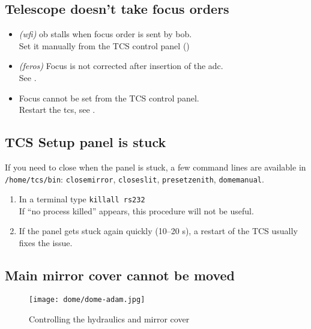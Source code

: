 \documentclass[11pt,fleqn,a4paper]{book}
\begin{document}
\subsection{Telescope doesn't take focus orders}

\begin{itemize}
  \item \textit{(\gls{wfi})} \gls{ob} \gls{stall}s when \gls{focus} order is sent by \gls{bob}.\\
        Set it manually from the \gls{TCS control panel} ()
  \item \textit{(\gls{feros})} Focus is not corrected after insertion of the \gls{adc}.\\
        See .
  \item Focus cannot be set from the \gls{TCS control panel}.\\
        Restart the \gls{tcs}, see .
\end{itemize}

\subsection{TCS Setup panel is stuck}

If you need to close when the panel is stuck, a few command lines are available in \texttt{/home/tcs/bin}: \texttt{closemirror}, \texttt{closeslit}, \texttt{presetzenith}, \texttt{domemanual}. 

\label{proc:unstuckTCSpanel}
\begin{enumerate}
  \item In a terminal type \texttt{killall rs232}\\
        If ``no process killed'' appears, this procedure will not be useful.
  \item If the panel gets stuck again quickly (10--20 s), a restart of the TCS usually fixes the issue. 
\end{enumerate}

\subsection{Main mirror cover cannot be moved}
\begin{figure}
\centering
\texttt{[image: dome/dome-adam.jpg]}
\caption{Controlling the hydraulics and mirror cover}
\label{fig:dome-adam}
\end{figure}
\end{document}
